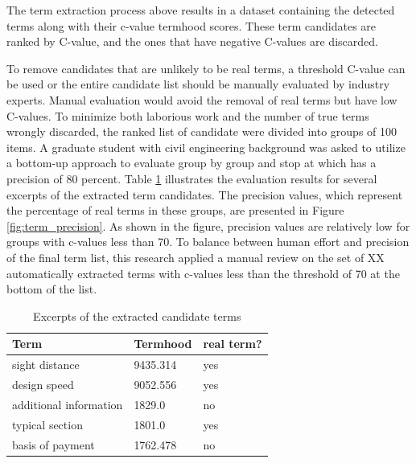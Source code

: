 \documentclass[Journal, BackFigs, DoubleSpace]{ascelike}%
\begin{document}
%
\par
The term extraction process above results in a dataset containing the detected terms along with their c-value termhood scores. These term candidates are ranked by C-value, and the ones that have negative C-values are discarded. %
\par
To remove candidates that are unlikely to be real terms, a threshold C-value can be used or the entire candidate list should be manually evaluated by industry experts. Manual evaluation would avoid the removal of real terms but have low C-values. To minimize both laborious work and the number of true terms wrongly discarded, the ranked list of candidate were divided into groups of 100 items. A graduate student with civil engineering background was asked to utilize a bottom-up approach to evaluate group by group and stop at which has a precision of 80 percent. Table \ref{table:term_evaluation} illustrates the evaluation results for several excerpts of the extracted term candidates. The precision values, which represent the percentage of real terms in these groups, are presented in Figure \ref{fig:term_precision}. As shown in the figure, precision values are relatively low for groups with c-values less than 70. To balance between human effort and precision of the final term list, this research applied a manual review on the set of XX automatically extracted terms with c-values less than the threshold of 70 at the bottom of the list.
%
\begin{table} [t]
	\caption{Excerpts of the extracted candidate terms}
	\label{table:term_evaluation}
	\centering
	\small
	\renewcommand{\arraystretch}{1.25}
	\begin{tabular}{l l l}
		\hline
		\textbf{Term} & \textbf{Termhood} & \textbf{real term?}\\
		\hline
		sight distance		& 9435.314 & yes\\
		design speed & 9052.556 & yes \\
		additional information & 1829.0 & no\\
		typical section & 1801.0  & yes\\
		basis of payment & 1762.478 & no\\
		\hline
	\end{tabular}
	
	\normalsize
\end{table}
\end{document}
